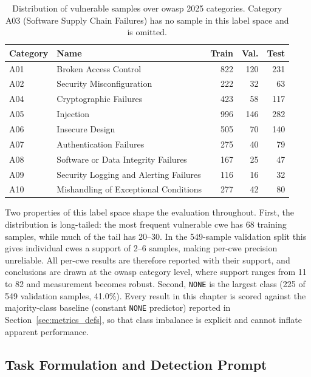 \begin{table}[H]
\centering
\caption{Distribution of vulnerable samples over \gls{owasp} 2025 categories.
Category A03 (Software Supply Chain Failures) has no sample in this label
space and is omitted.}
\label{tab:owasp_split}
\footnotesize
\begin{tabular}{l l r r r}
\toprule
\textbf{Category} & \textbf{Name} & \textbf{Train} & \textbf{Val.} & \textbf{Test} \\
\midrule
A01 & Broken Access Control                     & 822 & 120 & 231 \\
A02 & Security Misconfiguration                 & 222 &  32 &  63 \\
A04 & Cryptographic Failures                    & 423 &  58 & 117 \\
A05 & Injection                                 & 996 & 146 & 282 \\
A06 & Insecure Design                           & 505 &  70 & 140 \\
A07 & Authentication Failures                   & 275 &  40 &  79 \\
A08 & Software or Data Integrity Failures       & 167 &  25 &  47 \\
A09 & Security Logging and Alerting Failures    & 116 &  16 &  32 \\
A10 & Mishandling of Exceptional Conditions     & 277 &  42 &  80 \\
\bottomrule
\end{tabular}
\end{table}

Two properties of this label space shape the evaluation throughout. First, the distribution is long-tailed: the most frequent vulnerable \gls{cwe} has 68 training samples, while much of the tail has 20--30. In the 549-sample validation split this gives individual \glspl{cwe} a support of 2--6 samples, making per-\gls{cwe} precision unreliable. All per-\gls{cwe} results are therefore reported with their support, and conclusions are drawn at the \gls{owasp} category level, where support ranges from 11 to 82 and measurement becomes robust. Second, \texttt{NONE} is the largest class (225 of 549 validation samples, 41.0\%). Every result in this chapter is scored against the majority-class baseline (constant \texttt{NONE} predictor) reported in Section~\ref{sec:metrics_defs}, so that class imbalance is explicit and cannot inflate apparent performance.


\subsection{Task Formulation and Detection Prompt}
\label{sec:task_prompt}

